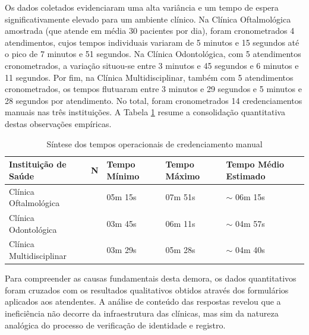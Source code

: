 Os dados coletados evidenciaram uma alta variância e um tempo de espera significativamente elevado para um ambiente clínico. Na Clínica Oftalmológica amostrada (que atende em média 30 pacientes por dia), foram cronometrados 4 atendimentos, cujos tempos individuais variaram de 5 minutos e 15 segundos até o pico de 7 minutos e 51 segundos. Na Clínica Odontológica, com 5 atendimentos cronometrados, a variação situou-se entre 3 minutos e 45 segundos e 6 minutos e 11 segundos. Por fim, na Clínica Multidisciplinar, também com 5 atendimentos cronometrados, os tempos flutuaram entre 3 minutos e 29 segundos e 5 minutos e 28 segundos por atendimento. No total, foram cronometrados 14 credenciamentos manuais nas três instituições. A Tabela \ref{tab:tempos_credenciamento} resume a consolidação quantitativa destas observações empíricas.

\begin{table}[H]
    \centering
    \caption{Síntese dos tempos operacionais de credenciamento manual}
    \label{tab:tempos_credenciamento}
    \small
    \begin{tabularx}{\textwidth}{>{\raggedright\arraybackslash}p{4.2cm} >{\centering\arraybackslash}p{0.8cm} >{\centering\arraybackslash}p{2.4cm} >{\centering\arraybackslash}p{2.4cm} >{\centering\arraybackslash}X}
        \toprule
        \textbf{Instituição de Saúde} & \textbf{N} & \textbf{Tempo Mínimo} & \textbf{Tempo Máximo} & \textbf{Tempo Médio Estimado} \\ 
        \midrule
        Clínica Oftalmológica & 4 & 05m 15s & 07m 51s & $\sim$ 06m 15s \\
        Clínica Odontológica & 5 & 03m 45s & 06m 11s & $\sim$ 04m 57s \\
        Clínica Multidisciplinar & 5 & 03m 29s & 05m 28s & $\sim$ 04m 40s \\
        \bottomrule
    \end{tabularx}
\end{table}

Para compreender as causas fundamentais desta demora, os dados quantitativos foram cruzados com os resultados qualitativos obtidos através dos formulários aplicados aos atendentes. A análise de conteúdo das respostas revelou que a ineficiência não decorre da infraestrutura das clínicas, mas sim da natureza analógica do processo de verificação de identidade e registro.  

